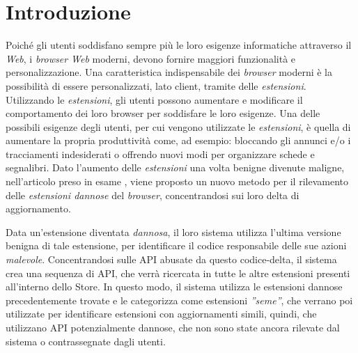 \documentclass[ 11pt, oneside, italian, onehalfspacing, headsepline, ]{MastersDoctoralThesis}
\begin{document}

{\chapter{Introduzione}}

Poiché gli utenti soddisfano sempre più le loro esigenze informatiche attraverso il \textit{Web}, i \textit{browser Web} moderni, devono fornire maggiori funzionalità e personalizzazione. \newline 
Una caratteristica indispensabile dei \textit{browser} moderni è la possibilità di essere personalizzati, lato client, tramite delle \textit{estensioni}. \newline
Utilizzando le \textit{estensioni}, gli utenti possono aumentare e modificare il comportamento dei loro browser per soddisfare le loro esigenze. \newline
Una delle possibili esigenze degli utenti, per cui vengono utilizzate le \textit{estensioni}, è quella di aumentare la propria produttività come, ad esempio: bloccando gli annunci e/o i tracciamenti indesiderati o offrendo nuovi modi per organizzare schede e segnalibri. \newline
Dato l'aumento delle \textit{estensioni} una volta benigne divenute maligne, nell'articolo preso in esame \citep{ReferenceArticle}, viene proposto un nuovo metodo per il rilevamento delle \textit{estensioni dannose} del \textit{browser}, concentrandosi sui loro delta di aggiornamento. \par
Data un'estensione diventata \textit{dannosa}, il loro sistema utilizza l'ultima versione benigna di tale estensione, per identificare il codice responsabile delle sue azioni \textit{malevole}. Concentrandosi sulle API abusate da questo codice-delta, il sistema crea una sequenza di API, che verrà ricercata in tutte le altre estensioni presenti all'interno dello Store. \newline
In questo modo, il sistema utilizza le estensioni dannose precedentemente trovate e le categorizza come estensioni  \textit{''seme''}, che verrano poi utilizzate per identificare estensioni con aggiornamenti simili, quindi, che utilizzano API potenzialmente dannose, che non sono state ancora rilevate dal sistema o contrassegnate dagli utenti.
\end{document}
